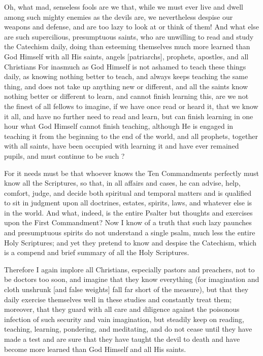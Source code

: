 Oh, what mad, senseless fools are we that, while we must ever live and
dwell among such mighty enemies as the devils are, we nevertheless
despise our weapons and defense, and are too lazy to look at or think
of them! And what else are such supercilious, presumptuous saints, who
are unwilling to read and study the Catechism daily, doing than
esteeming themselves much more learned than God Himself with all His
saints, angels [patriarchs], prophets, apostles, and all Christians For
inasmuch as God Himself is not ashamed to teach these things daily, as
knowing nothing better to teach, and always keeps teaching the same
thing, and does not take up anything new or different, and all the
saints know nothing better or different to learn, and cannot finish
learning this, are we not the finest of all fellows to imagine, if we
have once read or heard it, that we know it all, and have no further
need to read and learn, but can finish learning in one hour what God
Himself cannot finish teaching, although He is engaged in teaching it
from the beginning to the end of the world, and all prophets, together
with all saints, have been occupied with learning it and have ever
remained pupils, and must continue to be such ?

For it needs must be that whoever knows the Ten Commandments perfectly
must know all the Scriptures, so that, in all affairs and cases, he can
advise, help, comfort, judge, and decide both spiritual and temporal
matters and is qualified to sit in judgment upon all doctrines,
estates, spirits, laws, and whatever else is in the world. And what,
indeed, is the entire Psalter but thoughts and exercises upon the First
Commandment? Now I know of a truth that such lazy paunches and
presumptuous spirits do not understand a single psalm, much less the
entire Holy Scriptures; and yet they pretend to know and despise the
Catechism, which is a compend and brief summary of all the Holy
Scriptures.

Therefore I again implore all Christians, especially pastors and
preachers, not to be doctors too soon, and imagine that they know
everything (for imagination and cloth unshrunk [and false weights] fall
far short of the measure), but that they daily exercise themselves well
in these studies and constantly treat them; moreover, that they guard
with all care and diligence against the poisonous infection of such
security and vain imagination, but steadily keep on reading, teaching,
learning, pondering, and meditating, and do not cease until they have
made a test and are sure that they have taught the devil to death and
have become more learned than God Himself and all His saints.

